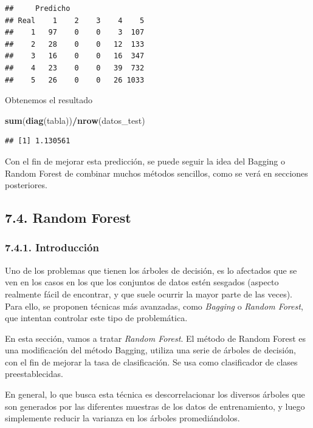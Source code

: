 \documentclass[spanish,]{article}
\newenvironment{Shaded}{\begin{snugshade}}{\end{snugshade}}
\newcommand{\KeywordTok}[1]{\textcolor[rgb]{0.13,0.29,0.53}{\textbf{#1}}}
\newcommand{\OperatorTok}[1]{\textcolor[rgb]{0.81,0.36,0.00}{\textbf{#1}}}
\newcommand{\NormalTok}[1]{#1}
\begin{document}
\begin{verbatim}
##     Predicho
## Real    1    2    3    4    5
##    1   97    0    0    3  107
##    2   28    0    0   12  133
##    3   16    0    0   16  347
##    4   23    0    0   39  732
##    5   26    0    0   26 1033
\end{verbatim}

Obtenemos el resultado

\begin{Shaded}
\begin{Highlighting}[]
\KeywordTok{sum}\NormalTok{(}\KeywordTok{diag}\NormalTok{(tabla))}\OperatorTok{/}\KeywordTok{nrow}\NormalTok{(datos_test)}
\end{Highlighting}
\end{Shaded}

\begin{verbatim}
## [1] 1.130561
\end{verbatim}

Con el fin de mejorar esta predicción, se puede seguir la idea del
Bagging o Random Forest de combinar muchos métodos sencillos, como se
verá en secciones posteriores.

\subsection{7.4. Random Forest}\label{random-forest}

\subsubsection{7.4.1. Introducción}\label{introduccion-1}

Uno de los problemas que tienen los árboles de decisión, es lo afectados
que se ven en los casos en los que los conjuntos de datos estén sesgados
(aspecto realmente fácil de encontrar, y que suele ocurrir la mayor
parte de las veces). Para ello, se proponen técnicas más avanzadas, como
\emph{Bagging} o \emph{Random Forest}, que intentan controlar este tipo
de problemática.

En esta sección, vamos a tratar \emph{Random Forest}. El método de
Random Forest es una modificación del método Bagging, utiliza una serie
de árboles de decisión, con el fin de mejorar la tasa de clasificación.
Se usa como clasificador de clases preestablecidas.

En general, lo que busca esta técnica es descorrelacionar los diversos
árboles que son generados por las diferentes muestras de los datos de
entrenamiento, y luego simplemente reducir la varianza en los árboles
promediándolos.
\end{document}
